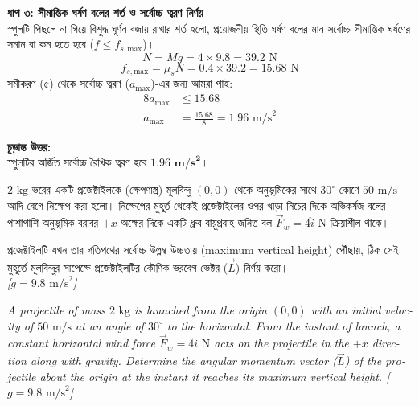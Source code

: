 \documentclass[12pt, a4paper]{article}
\begin{document}
\begin{tcolorbox}[solutionbox={সমাধান (Solution)}]
\vspace{0.5em}
\noindent
\textbf{ধাপ ৩: সীমান্তিক ঘর্ষণ বলের শর্ত ও সর্বোচ্চ ত্বরণ নির্ণয়} \\
স্পুলটি পিছলে না গিয়ে বিশুদ্ধ ঘূর্ণন বজায় রাখার শর্ত হলো, প্রয়োজনীয় স্থিতি ঘর্ষণ বলের মান সর্বোচ্চ সীমান্তিক ঘর্ষণের সমান বা কম হতে হবে ($f \le f_{s,\text{max}}$)।
\[ N = M g = 4 \times 9.8 = 39.2\text{ N} \]
\[ f_{s,\text{max}} = \mu_s N = 0.4 \times 39.2 = 15.68\text{ N} \]
সমীকরণ (৫) থেকে সর্বোচ্চ ত্বরণ ($a_{\text{max}}$)-এর জন্য আমরা পাই:
\begin{align*}
    8 a_{\text{max}} &\le 15.68 \\
    a_{\text{max}} &= \frac{15.68}{8} = 1.96\text{ m/s}^2
\end{align*}

\vspace{1em}
\begin{tcolorbox}[answerbox]
\textbf{চূড়ান্ত উত্তর:} \\
স্পুলটির অর্জিত সর্বোচ্চ রৈখিক ত্বরণ হবে $\mathbf{1.96 \text{ m/s}^2}$।
\end{tcolorbox}
\end{tcolorbox}

\begin{tcolorbox}[questionbox={প্রশ্ন (Question) 7}]
\noindent
$2\text{ kg}$ ভরের একটি প্রজেক্টাইলকে (ক্ষেপণাস্ত্র) মূলবিন্দু $(0,0)$ থেকে অনুভূমিকের সাথে $30^\circ$ কোণে $50\text{ m/s}$ আদি বেগে নিক্ষেপ করা হলো। নিক্ষেপের মুহূর্ত থেকেই প্রজেক্টাইলের ওপর খাড়া নিচের দিকে অভিকর্ষজ বলের পাশাপাশি অনুভূমিক বরাবর $+x$ অক্ষের দিকে একটি ধ্রুব বায়ুপ্রবাহ জনিত বল $\vec{F}_w = 4\hat{i}\text{ N}$ ক্রিয়াশীল থাকে। 

\vspace{0.3em}
\noindent
প্রজেক্টাইলটি যখন তার গতিপথের সর্বোচ্চ উল্লম্ব উচ্চতায় (maximum vertical height) পৌঁছায়, ঠিক সেই মুহূর্তে মূলবিন্দুর সাপেক্ষে প্রজেক্টাইলটির কৌণিক ভরবেগ ভেক্টর ($\vec{L}$) নির্ণয় করো। \\
\textit{[$g = 9.8\text{ m/s}^2$]}

\vspace{0.8em}
\begin{english}
\noindent\textit{\color{darkgray}
A projectile of mass $2\text{ kg}$ is launched from the origin $(0,0)$ with an initial velocity of $50\text{ m/s}$ at an angle of $30^\circ$ to the horizontal. From the instant of launch, a constant horizontal wind force $\vec{F}_w = 4\hat{i}\text{ N}$ acts on the projectile in the $+x$ direction along with gravity. Determine the angular momentum vector ($\vec{L}$) of the projectile about the origin at the instant it reaches its maximum vertical height. [$g = 9.8\text{ m/s}^2$]
}
\end{english}
\end{tcolorbox}
\end{document}
